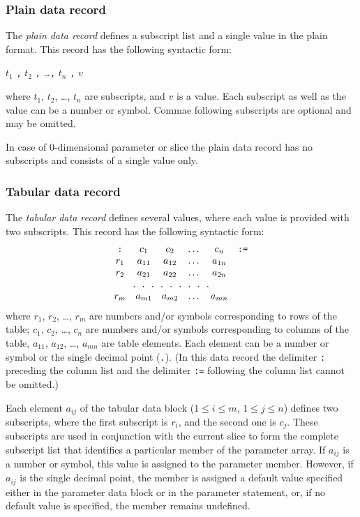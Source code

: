 \documentclass[10pt]{article}
\begin{document}
\subsubsection{Plain data record}

The {\it plain data record} defines a subscript list and a single value
in the plain format. This record has the following syntactic form:

\medskip

\noindent\hfil
$t_1$ {\tt,} $t_2$ {\tt,} \dots {\tt,} $t_n$ {\tt,} $v$

\medskip

\noindent where $t_1$, $t_2$, \dots, $t_n$ are subscripts, and $v$ is a
value. Each subscript as well as the value can be a number or symbol.
Commae following subscripts are optional and may be omitted.

In case of 0-dimensional parameter or slice the plain data record has
no subscripts and consists of a single value only.

\subsubsection{Tabular data record}

The {\it tabular data record} defines several values, where each value
is provided with two subscripts. This record has the following
syntactic form:
$$\begin{array}{cccccc}
\mbox{{\tt:}}&c_1&c_2&\dots&c_n&\mbox{{\tt:=}}\\
r_1&a_{11}&a_{12}&\dots&a_{1n}&\\
r_2&a_{21}&a_{22}&\dots&a_{2n}&\\
\multicolumn{5}{c}{.\ \ .\ \ .\ \ .\ \ .\ \ .\ \ .\ \ .\ \ .}&\\
r_m&a_{m1}&a_{m2}&\dots&a_{mn}&\\
\end{array}$$
where $r_1$, $r_2$, \dots, $r_m$ are numbers and/or symbols
corresponding to rows of the table; $c_1$, $c_2$, \dots, $c_n$ are
numbers and/or symbols corresponding to columns of the table, $a_{11}$,
$a_{12}$, \dots, $a_{mn}$ are table elements. Each element can be a
number or symbol or the single decimal point ({\tt.}). (In this data
record the delimiter {\tt:} preceding the column list and the delimiter
{\tt:=} following the column list cannot be omitted.)

Each element $a_{ij}$ of the tabular data block ($1\leq i\leq m$,
$1\leq j\leq n$) defines two subscripts, where the first subscript is
$r_i$, and the second one is $c_j$. These subscripts are used in
conjunction with the current slice to form the complete subscript list
that identifies a particular member of the parameter array. If $a_{ij}$
is a number or symbol, this value is assigned to the parameter member.
However, if $a_{ij}$ is the single decimal point, the member is
assigned a default value specified either in the parameter data block
or in the parameter statement, or, if no default value is specified,
the member remains undefined.
\end{document}
